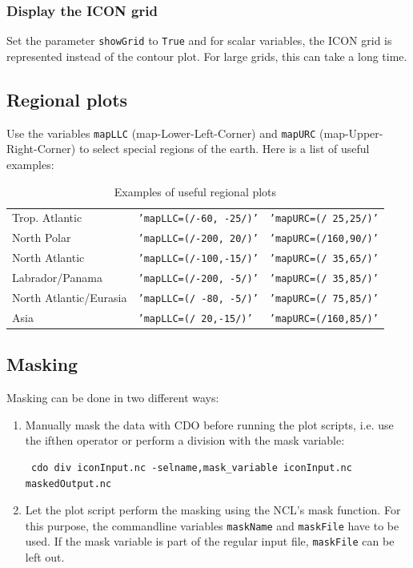 \subsubsection{Display the ICON grid}
Set the parameter {\tt showGrid} to {\tt True} and for scalar variables, the ICON grid is represented instead of the contour plot. For large grids, this can take a long time.

\subsection{Regional plots}
Use the variables {\tt mapLLC} (map-Lower-Left-Corner) and {\tt mapURC} (map-Upper-Right-Corner) to select special regions of the earth. Here is a list of useful examples:

\begin{table}[htd]
\caption{Examples of useful regional plots}
\begin{center}
\begin{tabular}{lll}\hline
Trop. Atlantic &	{\tt 'mapLLC=(/-60, -25/)'}	& {\tt 'mapURC=(/ 25,25/)'}\\
North Polar	&{\tt 'mapLLC=(/-200, 20/)'}	& {\tt 'mapURC=(/160,90/)'}\\
North Atlantic	&{\tt 'mapLLC=(/-100,-15/)'}	& {\tt 'mapURC=(/ 35,65/)'}\\
Labrador/Panama	&{\tt 'mapLLC=(/-200, -5/)'}	 &{\tt 'mapURC=(/ 35,85/)'}\\
North Atlantic/Eurasia&	{\tt 'mapLLC=(/ -80, -5/)'}&	 {\tt 'mapURC=(/ 75,85/)'}\\
Asia	&{\tt 'mapLLC=(/ 20,-15/)'}	& {\tt 'mapURC=(/160,85/)'}\\\hline
\end{tabular}
\end{center}
\end{table}

\newpage

\subsection{Masking}
Masking can be done in two different ways:
\begin{enumerate}
\item Manually mask the data with CDO before running the plot scripts, i.e. use the ifthen operator or perform a division with the mask variable:
\begin{small}
\begin{verbatim}
 cdo div iconInput.nc -selname,mask_variable iconInput.nc maskedOutput.nc
\end{verbatim}
\end{small}
\item Let the plot script perform the masking using the NCL's mask function. For this purpose, the commandline variables {\tt maskName} and {\tt maskFile} have to be used. If the mask variable is part of the regular input file, {\tt maskFile} can be left out.
\end{enumerate}


